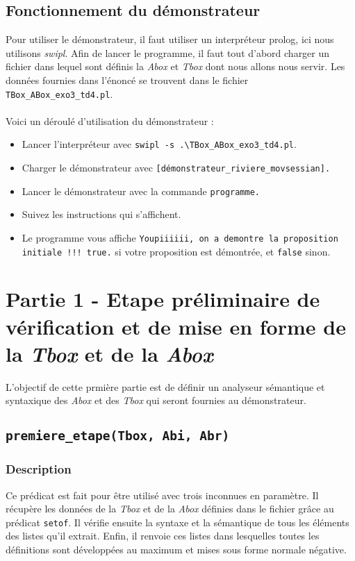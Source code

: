 \documentclass{article}
\newcommand{\code}[1]{\colorbox{light-gray}{\texttt{#1}}}
\begin{document}
\subsection{Fonctionnement du démonstrateur}
Pour utiliser le démonstrateur, il faut utiliser un interpréteur prolog, ici nous utilisons \textit{swipl}. Afin de lancer le programme, il faut tout d'abord charger un fichier dans lequel sont définis la \textit{Abox} et \textit{Tbox} dont nous allons nous servir.
Les données fournies dans l'énoncé se trouvent dans le fichier \code{TBox\_ABox\_exo3\_td4.pl}.
\\\\
\noindent Voici un déroulé d'utilisation du démonstrateur :
\begin{itemize}
    \item Lancer l'interpréteur avec \code{swipl -s .\textbackslash TBox\_ABox\_exo3\_td4.pl}.
    \item Charger le démonstrateur avec \code{[démonstrateur\_riviere\_movsessian].}
    \item Lancer le démonstrateur avec la commande \code{programme.}
    \item Suivez les instructions qui s'affichent.
    \item Le programme vous affiche \code{Youpiiiiii, on a demontre la proposition initiale !!!
true.} si votre proposition est démontrée, et \code{false} sinon.
\end{itemize}



\newpage
\section{Partie 1 - Etape préliminaire de vérification et de mise en forme de la \textit{Tbox} et de la \textit{Abox}}
L'objectif de cette prmière partie est de définir un analyseur sémantique et syntaxique des \textit{Abox} et des \textit{Tbox} qui seront fournies au démonstrateur.

\subsection{\code{premiere\_etape(Tbox, Abi, Abr)}}
\subsubsection{Description}

Ce prédicat est fait pour être utilisé avec trois inconnues en paramètre. Il récupère les données de la \textit{Tbox} et de la \textit{Abox} définies dans le fichier grâce au prédicat \code{setof}. Il vérifie ensuite la syntaxe et la sémantique de tous les éléments des listes qu'il extrait. Enfin, il renvoie ces listes dans lesquelles toutes les définitions sont développées au maximum et mises sous forme normale négative.
\end{document}
